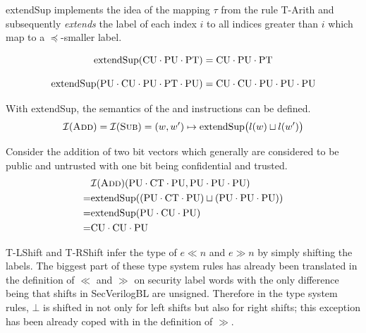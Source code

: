 extendSup implements the idea of the mapping $ \tau $ from the rule T-Arith and subsequently \textit{extends} the label of each index $ i $ to all indices greater than $ i $ which map to a $ \preceq $-smaller label.

\begin{example}
    \begin{equation*}
        \text{extendSup}(\text{CU} \cdot
        \text{PU} \cdot \text{PT}) = \text{CU} \cdot \text{PU} \cdot \text{PT}
    \end{equation*}

    \begin{equation*}
        \text{extendSup}(\text{PU} \cdot \text{CU} \cdot \text{PU} \cdot \text{PT} \cdot \text{PU}) = \text{CU} \cdot \text{CU} \cdot \text{PU} \cdot \text{PU} \cdot \text{PU}
    \end{equation*}
\end{example}

With extendSup, the semantics of the  and  instructions can be defined.
\begin{equation*}
    \mathcal{I}(\textsc{Add}) = \mathcal{I}(\textsc{Sub}) = (w, w') \mapsto \text{extendSup}\big(l(w) \sqcup l(w') \big)
\end{equation*}

\begin{example}
    Consider the addition of two bit vectors which generally are considered to be public and untrusted with one bit being confidential and trusted.
    \begin{align*}
        & \mathcal{I}(\textsc{Add})(\text{PU} \cdot \text{CT} \cdot \text{PU}, \text{PU} \cdot \text{PU} \cdot \text{PU}) \\
        =& \text{extendSup}((\text{PU} \cdot \text{CT} \cdot \text{PU}) \sqcup (\text{PU} \cdot \text{PU} \cdot \text{PU})) \\
        =& \text{extendSup}(\text{PU} \cdot \text{CU} \cdot \text{PU}) \\
        =& \text{CU} \cdot \text{CU} \cdot \text{PU}
    \end{align*}
\end{example}

T-LShift and T-RShift infer the type of $ e \ll n $ and $ e \gg n $ by simply shifting the labels.
The biggest part of these type system rules has already been translated in the definition of $ \ll $ and $ \gg $ on security label words with the only difference being that shifts in SecVerilogBL are unsigned.
Therefore in the type system rules, $ \bot $ is shifted in not only for left shifts but also for right shifts; this exception has been already coped with in the definition of $ \gg $.

